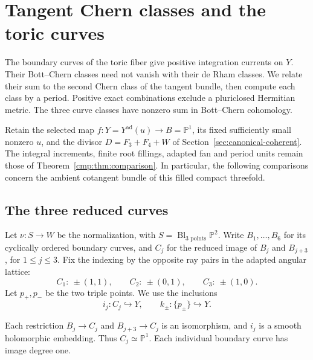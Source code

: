 \section{Tangent Chern classes and the toric curves}
\label{sec:tangent-curves}

The boundary curves of the toric fiber give positive integration
currents on $Y$. Their Bott--Chern classes need not vanish with
their de Rham classes. We relate their sum to the second Chern
class of the tangent bundle, then compute each class by a period.
Positive exact combinations exclude a pluriclosed Hermitian metric.
The three curve classes have nonzero sum in Bott--Chern cohomology.

Retain the selected map $f:Y=Y^{\mathrm{ad}}(u)\to B=\mathbb P^1$,
its fixed sufficiently small nonzero $u$, and the divisor
$D=F_3+F_4+W$ of Section~\ref{sec:canonical-coherent}.
The integral increments, finite root fillings, adapted fan and
period units remain those of Theorem~\ref{cmp:thm:comparison}.
In particular, the following comparisons concern the ambient
cotangent bundle of this filled compact threefold.

\subsection{The three reduced curves}

Let $\nu:S\to W$ be the normalization, with
$S=\operatorname{Bl}_{3\text{ points}}\mathbb P^2$.
Write $B_1,\ldots,B_6$ for its cyclically ordered boundary curves,
and $C_j$ for the reduced image of $B_j$ and $B_{j+3}$,
for $1\le j\le3$.
Fix the indexing by the opposite ray pairs in the adapted angular
lattice:
\begin{equation}\label{tc:eq:curve-indexing}
 C_1:\ \pm(1,1),\qquad C_2:\ \pm(0,1),\qquad
 C_3:\ \pm(1,0).
\end{equation}
Let $p_+,p_-$ be the two triple points. We use the inclusions
\[
 i_j:C_j\hookrightarrow Y,\qquad
 k_\pm:\{p_\pm\}\hookrightarrow Y.
\]

\begin{lemma}\label{tc:lem:curve-embeddings}
Each restriction $B_j\to C_j$ and $B_{j+3}\to C_j$ is an
isomorphism, and $i_j$ is a smooth holomorphic embedding.
Thus $C_j\simeq\mathbb P^1$.
Each individual boundary curve has image degree one.
\end{lemma}


